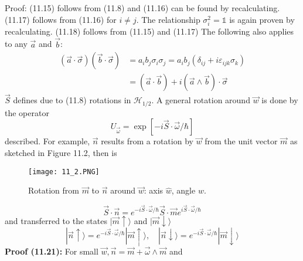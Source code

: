 Proof: (11.15) follows from (11.8) and (11.16) can be found by recalculating. (11.17) follows from (11.16) for $i\neq j$. The relationship $\sigma_i^2=\mathbb{1}$ is again proven by recalculating. (11.18) follows from (11.15) and (11.17)
The following also applies to any $\vec{a}$ and $\vec{b}$:
\begin{equation}
\begin{aligned}(\vec{a} \cdot \vec{\sigma})(\vec{b} \cdot \vec{\sigma}) &=a_{i} b_{j} \sigma_{i} \sigma_{j}=a_{i} b_{j}\left(\delta_{i j}+i \varepsilon_{i j k} \sigma_{k}\right) \\ &=(\vec{a} \cdot \vec{b})+i(\vec{a} \wedge \vec{b}) \cdot \vec{\sigma} \end{aligned}
\end{equation}
$\vec{S}$ defines due to (11.8) rotations in $\mathcal{H}_{1/2}$. A general rotation around $\vec{w}$ is done by the operator
\begin{equation}
    U_{\vec{\omega}}=\exp [-i \vec{S} \cdot \vec{\omega} / \hbar]
    \end{equation}
described. For example, $\vec{n}$ results from a rotation by $\vec{w}$ from the unit vector $\vec{m}$ as sketched in Figure 11.2, then is
\begin{figure}[ht]
    \begin{minipage}{0.5\textwidth}
        \centering
        \texttt{[image: 11\_2.PNG]}
    \end{minipage}
    \begin{minipage}{0.5\textwidth}
        \caption{Rotation from $\vec{m}$ to $\vec{n}$ around $\vec{w}$: axis $\hat{w}$, angle $w$.}
    \end{minipage}
\end{figure}
\begin{equation}
    \vec{S} \cdot \vec{n}=e^{-i \vec{S} \cdot \vec{\omega} / \hbar} \vec{S} \cdot \vec{m} e^{i \vec{S} \cdot \vec{\omega} / \hbar}
    \end{equation}
and transferred to the states $|\vec{m}\uparrow\rangle$ and $|\vec{m}\downarrow\rangle$
\begin{equation}
    |\vec{n} \uparrow\rangle= e^{-i \vec{S} \cdot \vec{\omega} / \hbar}|\vec{m} \uparrow\rangle, \quad|\vec{n} \downarrow\rangle= e^{-i \vec{S} \cdot \vec{\omega} / \hbar}|\vec{m} \downarrow\rangle
    \end{equation}
\textbf{Proof (11.21):} For small $\vec{w},\vec{n}=\vec{m}+\vec{\omega} \wedge \vec{m}$ and
